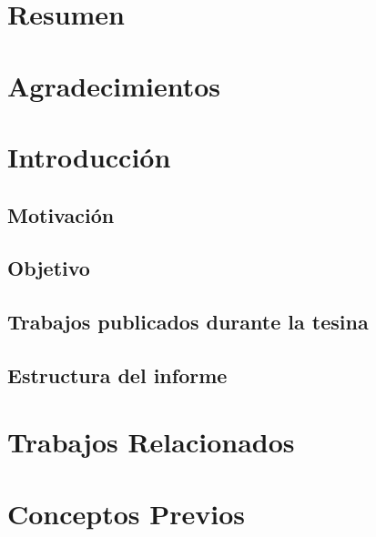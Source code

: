 \documentclass[a4paper,	11pt]{report}
\begin{document}
\titleGP
\newpage
\thispagestyle{empty}

\tableofcontents

\chapter*{Resumen}
\label{sec:abstract}


\chapter*{Agradecimientos}
\label{sec:acknowledgment}


\chapter{Introducción}
\label{sec:introduction}


\section{Motivación}
\label{sec:motivation}


\section{Objetivo}
\label{sec:objective}


\section{Trabajos publicados durante la tesina}
\label{sec:publications}


\section{Estructura del informe}
\label{sec:structure}


\chapter{Trabajos Relacionados}
\label{sec:related}


\chapter{Conceptos Previos}
\label{sec:prev_concepts}

\end{document}
